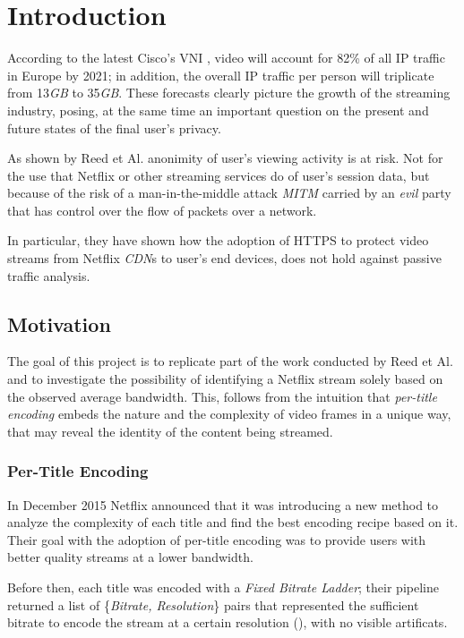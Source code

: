 \chapter{Introduction}\label{sec:introduction}

According to the latest Cisco's VNI \cite{video-traffic-forecast}, video will
account for 82\% of all IP traffic in Europe by 2021; in addition, the overall IP
traffic per person will triplicate from 13\emph{GB} to 35\emph{GB}. These
forecasts clearly picture the growth of the streaming industry, posing, at the
same time an important question on the present and future states of the final
user's privacy.

As shown by Reed et Al. \cite{netflix-real-time} anonimity of user's viewing
activity is at risk. Not for the use that Netflix or other streaming services
do of user's session data, but because of the risk of a man-in-the-middle
attack \emph{MITM} carried by an \textit{evil} party that has control over the
flow of packets over a network.

In particular, they have shown how the adoption of HTTPS to protect video
streams from Netflix \emph{CDN}s to user's end devices, does not hold against
passive traffic analysis.

\section{Motivation}\label{motivation}

The goal of this project is to replicate part of the work conducted by Reed et
Al. and to investigate the possibility of identifying a Netflix stream solely
based on the observed average bandwidth. This, follows from the intuition that
\emph{per-title encoding} embeds the nature and the complexity of video frames
in a unique way, that may reveal the identity of the content being streamed.

\subsection{Per-Title Encoding}\label{sec:per-title-encoding}

In December 2015 Netflix announced \cite{per-title-encoding} that it was
introducing a new method to analyze the complexity of each title and find the
best encoding recipe based on it. Their goal with the adoption of
per-title encoding was to provide users with better quality streams at a lower
bandwidth. 

Before then, each title was encoded with a \emph{Fixed Bitrate Ladder}; their
pipeline returned a list of \{\emph{Bitrate, Resolution}\} pairs that
represented the sufficient bitrate to encode the stream at a certain
resolution (), with no visible artificats.

